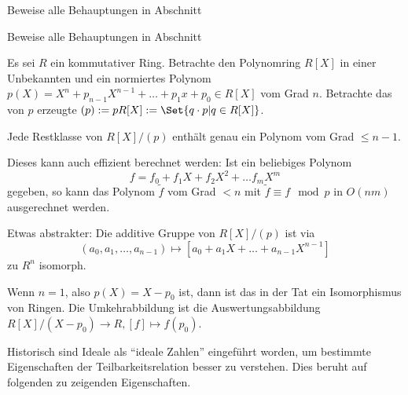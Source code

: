 \begin{sheet}

    \begin{problem}[title={Gruppen}]
        Beweise alle Behauptungen in Abschnitt \label{groups}
    \end{problem}

    \begin{problem}[title={Ringe}]
        Beweise alle Behauptungen in Abschnitt \label{rings}
    \end{problem}

    \begin{problem}[title={Quotienten von Polynomringen I}]
        Es sei $R$ ein kommutativer Ring. Betrachte den Polynomring $R[X]$ in einer Unbekannten und ein normiertes Polynom $p(X) = X^n + p_{n-1} X^{n-1} + \ldots + p_1 x+p_0 \in R[X]$ vom Grad $n$. Betrachte das von $p$ erzeugte  $(p):=pR[X]:=\Set{q\cdot p | q\in R[X]}$.


        \begin{subproblem}
            Jede Restklasse von $R[X]/(p)$ enthält genau ein Polynom vom Grad $\leq n-1$.

            Dieses kann auch effizient berechnet werden: Ist ein beliebiges Polynom
            \[f = f_0 + f_1 X + f_2 X ^2 + \ldots f_m X^m\]
            gegeben, so kann das Polynom $\tilde{f}$ vom Grad $<n$ mit $\tilde{f} \equiv f\mod p$ in $O(nm)$ ausgerechnet werden.
        \end{subproblem}

        \begin{subproblem}
            Etwas abstrakter: Die additive Gruppe von $R[X]/(p)$ ist via
            \[(a_0,a_1,\ldots,a_{n-1}) \mapsto [a_0+a_1 X+\ldots +a_{n-1}X^{n-1}]\]
            zu $R^n$ isomorph.
        \end{subproblem}

        \begin{subproblem}
            Wenn $n=1$, also $p(X) = X-p_0$ ist, dann ist das in der Tat ein Isomorphismus von Ringen. Die Umkehrabbildung ist die Auswertungsabbildung $R[X]/(X-p_0) \to R, [f] \mapsto f(p_0)$.
        \end{subproblem}
    \end{problem}

    \begin{problem}[title={Ideale vs. Teilbarkeit}]
        Historisch sind Ideale als \enquote{ideale Zahlen} eingeführt worden, um bestimmte Eigenschaften der Teilbarkeitsrelation besser zu verstehen. Dies beruht auf folgenden zu zeigenden Eigenschaften.


\end{problem}
\end{sheet}
